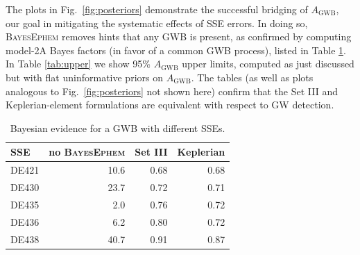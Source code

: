 \documentclass{aastex63}
\begin{document}
The plots in Fig.\ \ref{fig:posteriors} demonstrate the successful bridging of $A_\mathrm{GWB}$, our goal in mitigating the systematic effects of SSE errors. In doing so, \textsc{BayesEphem} removes hints that any GWB is present, as confirmed by computing model-2A Bayes factors (in favor of a common GWB process), listed in Table \ref{tab:bf}. In Table \ref{tab:upper} we show 95\% $A_\mathrm{GWB}$ upper limits, computed as just discussed but with flat uninformative priors on $A_\mathrm{GWB}$. The tables (as well as plots analogous to Fig.\ \ref{fig:posteriors} not shown here) confirm that the Set III and Keplerian-element formulations are equivalent with respect to GW detection.
%
\begin{table}[ht]
    \begin{center}
    \caption{Bayesian evidence for a GWB with different SSEs.\label{tab:bf}} 
    \begin{tabular}{l|r|r|r}
SSE & no \textsc{BayesEphem} & Set III & Keplerian \\
\hline
DE421 & 10.6 & 0.68 & 0.68 \\
DE430 & 23.7 & 0.72 & 0.71 \\
DE435 &  2.0 & 0.76 & 0.72 \\
DE436 &  6.2 & 0.80 & 0.72 \\
DE438 & 40.7 & 0.91 & 0.87
    \end{tabular}
\end{center}
\end{table}
%
\end{document}
